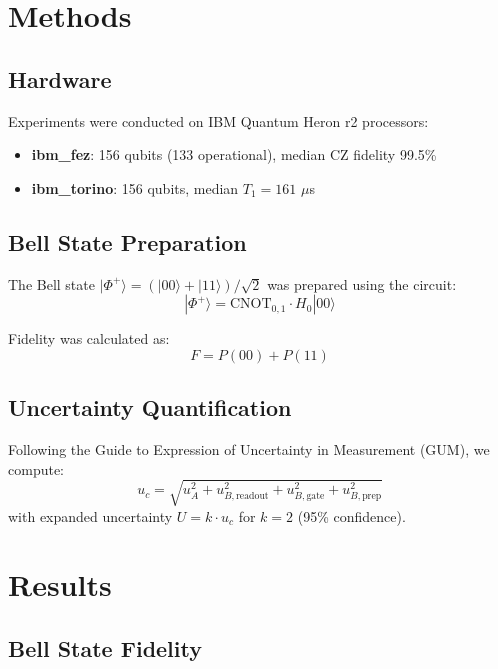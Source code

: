 \documentclass[twocolumn,showpacs,preprintnumbers,amsmath,amssymb,prl]{revtex4-2}
\begin{document}
\section{Methods}

\subsection{Hardware}

Experiments were conducted on IBM Quantum Heron r2 processors:
\begin{itemize}
\item \textbf{ibm\_fez}: 156 qubits (133 operational), median CZ fidelity 99.5\%
\item \textbf{ibm\_torino}: 156 qubits, median $T_1 = 161$ $\mu$s
\end{itemize}

\subsection{Bell State Preparation}

The Bell state $|\Phi^+\rangle = (|00\rangle + |11\rangle)/\sqrt{2}$ was
prepared using the circuit:
\begin{equation}
|\Phi^+\rangle = \text{CNOT}_{0,1} \cdot H_0 |00\rangle
\end{equation}

Fidelity was calculated as:
\begin{equation}
F = P(00) + P(11)
\end{equation}

\subsection{Uncertainty Quantification}

Following the Guide to Expression of Uncertainty in Measurement (GUM),
we compute:
\begin{equation}
u_c = \sqrt{u_A^2 + u_{B,\text{readout}}^2 + u_{B,\text{gate}}^2 + u_{B,\text{prep}}^2}
\end{equation}
with expanded uncertainty $U = k \cdot u_c$ for $k=2$ (95\% confidence).

\section{Results}

\subsection{Bell State Fidelity}
\end{document}
